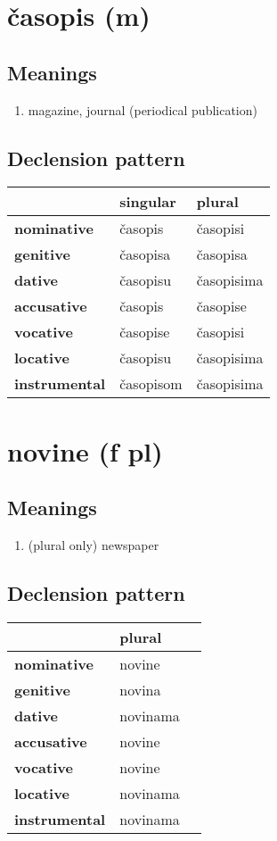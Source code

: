 \filbreak
\section{časopis (m)}
\subsection*{Meanings}
\begin{enumerate}
\item magazine, journal (periodical publication)
\end{enumerate}
\subsection*{Declension pattern}
\begin{tabularx}{\linewidth}{Xll}
\toprule
{} &   singular &      plural \\
\midrule
\textbf{nominative  } &    časopis &    časopisi \\
\textbf{genitive    } &   časopisa &    časopisa \\
\textbf{dative      } &   časopisu &  časopisima \\
\textbf{accusative  } &    časopis &    časopise \\
\textbf{vocative    } &   časopise &    časopisi \\
\textbf{locative    } &   časopisu &  časopisima \\
\textbf{instrumental} &  časopisom &  časopisima \\
\bottomrule
\end{tabularx}

\filbreak
\section{novine (f pl)}
\subsection*{Meanings}
\begin{enumerate}
\item (plural only) newspaper
\end{enumerate}
\subsection*{Declension pattern}
\begin{tabularx}{\linewidth}{Xll}
\toprule
{} &    plural \\
\midrule
\textbf{nominative  } &    novine \\
\textbf{genitive    } &    novina \\
\textbf{dative      } &  novinama \\
\textbf{accusative  } &    novine \\
\textbf{vocative    } &    novine \\
\textbf{locative    } &  novinama \\
\textbf{instrumental} &  novinama \\
\bottomrule
\end{tabularx}


